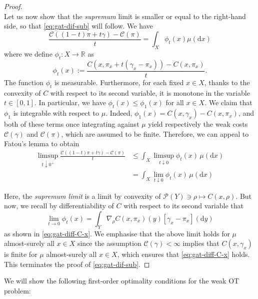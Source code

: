 \documentclass[leqno, 11pt, a4paper]{amsart}
\theoremstyle{definition}
\newcommand{\R}{\mathbb{R}}
\newcommand{\C}{\mathscr{C}}
\newcommand{\cP}{\mathcal{P}}
\newcommand{\dd}{\mathrm{d}}
\begin{document}
\begin{proof}
$$	$$
	Let us now show that the \textit{supremum} limit is smaller or equal to the right-hand side, so that \eqref{eq:gat-dif-sub} will follow. We have
	$$
	\frac{\C((1-t)\pi + t \gamma) - \C(\pi) }t= \int_{X} \phi_t(x) \mu(\dd x)
	$$
	where we define $\phi_t : X \to \R$ as 
	$$
	\phi_t(x) := \frac{C(x, \pi_x + t(\gamma_x - \pi_x)) - C(x, \pi_x)}{t}.
	$$
	The function $\phi_t$ is measurable. Furthermore, for each fixed $x \in X$, thanks to the convexity of $C$ with respect to its second variable, it is monotone in the variable $t \in [0,1]$. In particular, we have $\phi_t(x) \leq \phi_1(x)$ for all $x \in X$. We claim that $\phi_1$ is integrable with respect to $\mu$. Indeed, $\phi_1(x) = C(x, \gamma_x) - C(x, \pi_x)$, and both of these terms once integrating against $\mu$ yield respectively the weak costs $\C(\gamma)$ and $\C(\pi)$, which are assumed to be finite. Therefore, we can appeal to Fatou's lemma to obtain
	\begin{equation*}
    \begin{split}
      \limsup_{t \downarrow 0^+} \frac{\C((1-t)\pi + t \gamma) - \C(\pi) }t &\leq \int_{X} \limsup_{t \downarrow 0} \phi_t(x) \, \mu(\dd x)\\
      &= \int_{X} \lim_{t \downarrow 0} \phi_t(x) \, \mu(\dd x)
    \end{split}
\end{equation*}

	Here, the \textit{supremum limit} is a limit by convexity of $\cP(Y) \ni \rho \mapsto C(x, \rho)$. But now, we recall by differentiability of $C$ with respect to its second variable that $$\lim_{t \to 0} \phi_t(x) = \int_{Y} \nabla_\rho C(x, \pi_x)(y) [\gamma_x - \pi_x](\dd y)$$ as shown in \eqref{eq:gat-diff-C-x}. We emphasise that the above limit holds for $\mu$ almost-surely all $x \in X$ since the assumption $\C(\gamma) < \infty$ implies that $C(x, \gamma_x)$ is finite for $\mu$ almost-surely all $x \in X$, which ensures that \eqref{eq:gat-diff-C-x} holds. This terminates the proof of \eqref{eq:gat-dif-sub}.
\end{proof}

We will show the following first-order optimality conditions for the weak OT problem:
\end{document}
